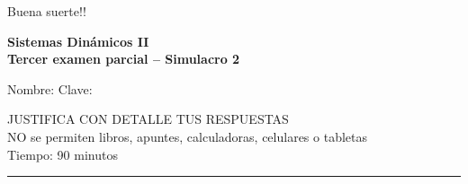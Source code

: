 \documentclass[11pt]{article}
\begin{document}
\vspace{0.5cm}
\begin{center}
\Large Buena suerte!!
\end{center}

\newpage
\textbf{Sistemas Dinámicos II}\\
\textbf{Tercer examen parcial -- Simulacro 2}

\vspace{0.6cm}
Nombre: \underline{\hspace{9cm}} \quad Clave: \underline{\hspace{3cm}}

\vspace{0.5cm}
\begin{center}
JUSTIFICA CON DETALLE TUS RESPUESTAS\\
NO se permiten libros, apuntes, calculadoras, celulares o tabletas\\
Tiempo: 90 minutos
\end{center}
\vspace{-0.2cm}
\rule{\textwidth}{0.4pt}
\vspace{0.2cm}
\end{document}
